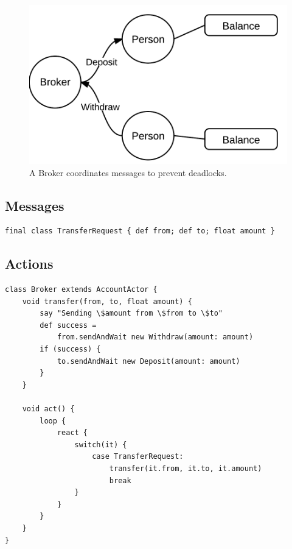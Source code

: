 \documentclass[a4paper,12pt]{kth-mag}
\begin{document}
\begin{figure}[H]
    \begin{center}
    \includegraphics{images/ActorsBroker.png}
    \end{center}
    \caption{A Broker coordinates messages to prevent deadlocks.}
    \label{fig:actorsBrooker}
\end{figure}

\subsection{Messages}

\begin{listing}[H]
	\begin{verbatim}
final class TransferRequest { def from; def to; float amount }
	\end{verbatim}
\end{listing}

\subsection{Actions}

\begin{listing}[H]
	\begin{verbatim}
class Broker extends AccountActor {
    void transfer(from, to, float amount) {
        say "Sending \$amount from \$from to \$to"
        def success = 
            from.sendAndWait new Withdraw(amount: amount)
        if (success) { 
            to.sendAndWait new Deposit(amount: amount) 
        } 
    }

    void act() {
        loop {
            react { 
                switch(it) {
                    case TransferRequest:
                        transfer(it.from, it.to, it.amount)
                        break
                }
            }
        }
    }
}
	\end{verbatim}
\end{listing}
\end{document}
